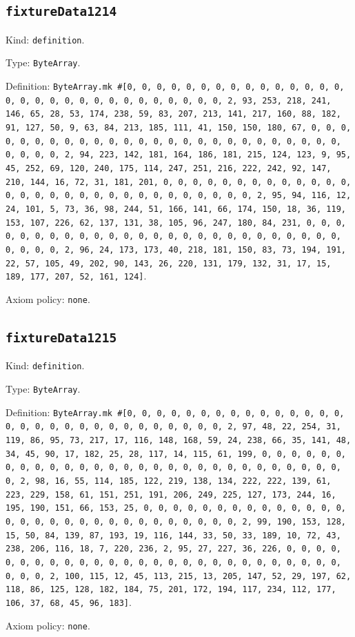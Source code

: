 \documentclass[11pt]{article}
\begin{document}
\subsection*{\texttt{fixtureData1214}}
\noindent Kind: \texttt{definition}.\par
\noindent Type: \texttt{ByteArray}.\par
\noindent Definition: \texttt{ByteArray.mk \#[0, 0, 0, 0, 0, 0, 0, 0, 0, 0, 0, 0, 0, 0, 0, 0, 0, 0, 0, 0, 0, 0, 0, 0, 0, 0, 0, 0, 0, 0, 2, 93, 253, 218, 241, 146, 65, 28, 53, 174, 238, 59, 83, 207, 213, 141, 217, 160, 88, 182, 91, 127, 50, 9, 63, 84, 213, 185, 111, 41, 150, 150, 180, 67, 0, 0, 0, 0, 0, 0, 0, 0, 0, 0, 0, 0, 0, 0, 0, 0, 0, 0, 0, 0, 0, 0, 0, 0, 0, 0, 0, 0, 0, 0, 2, 94, 223, 142, 181, 164, 186, 181, 215, 124, 123, 9, 95, 45, 252, 69, 120, 240, 175, 114, 247, 251, 216, 222, 242, 92, 147, 210, 144, 16, 72, 31, 181, 201, 0, 0, 0, 0, 0, 0, 0, 0, 0, 0, 0, 0, 0, 0, 0, 0, 0, 0, 0, 0, 0, 0, 0, 0, 0, 0, 0, 0, 0, 0, 2, 95, 94, 116, 12, 24, 101, 5, 73, 36, 98, 244, 51, 166, 141, 66, 174, 150, 18, 36, 119, 153, 107, 226, 62, 137, 131, 38, 105, 96, 247, 180, 84, 231, 0, 0, 0, 0, 0, 0, 0, 0, 0, 0, 0, 0, 0, 0, 0, 0, 0, 0, 0, 0, 0, 0, 0, 0, 0, 0, 0, 0, 0, 0, 2, 96, 24, 173, 173, 40, 218, 181, 150, 83, 73, 194, 191, 22, 57, 105, 49, 202, 90, 143, 26, 220, 131, 179, 132, 31, 17, 15, 189, 177, 207, 52, 161, 124]}.\par
\noindent Axiom policy: \texttt{none}.\par
\subsection*{\texttt{fixtureData1215}}
\noindent Kind: \texttt{definition}.\par
\noindent Type: \texttt{ByteArray}.\par
\noindent Definition: \texttt{ByteArray.mk \#[0, 0, 0, 0, 0, 0, 0, 0, 0, 0, 0, 0, 0, 0, 0, 0, 0, 0, 0, 0, 0, 0, 0, 0, 0, 0, 0, 0, 0, 0, 2, 97, 48, 22, 254, 31, 119, 86, 95, 73, 217, 17, 116, 148, 168, 59, 24, 238, 66, 35, 141, 48, 34, 45, 90, 17, 182, 25, 28, 117, 14, 115, 61, 199, 0, 0, 0, 0, 0, 0, 0, 0, 0, 0, 0, 0, 0, 0, 0, 0, 0, 0, 0, 0, 0, 0, 0, 0, 0, 0, 0, 0, 0, 0, 2, 98, 16, 55, 114, 185, 122, 219, 138, 134, 222, 222, 139, 61, 223, 229, 158, 61, 151, 251, 191, 206, 249, 225, 127, 173, 244, 16, 195, 190, 151, 66, 153, 25, 0, 0, 0, 0, 0, 0, 0, 0, 0, 0, 0, 0, 0, 0, 0, 0, 0, 0, 0, 0, 0, 0, 0, 0, 0, 0, 0, 0, 0, 0, 2, 99, 190, 153, 128, 15, 50, 84, 139, 87, 193, 19, 116, 144, 33, 50, 33, 189, 10, 72, 43, 238, 206, 116, 18, 7, 220, 236, 2, 95, 27, 227, 36, 226, 0, 0, 0, 0, 0, 0, 0, 0, 0, 0, 0, 0, 0, 0, 0, 0, 0, 0, 0, 0, 0, 0, 0, 0, 0, 0, 0, 0, 0, 0, 2, 100, 115, 12, 45, 113, 215, 13, 205, 147, 52, 29, 197, 62, 118, 86, 125, 128, 182, 184, 75, 201, 172, 194, 117, 234, 112, 177, 106, 37, 68, 45, 96, 183]}.\par
\noindent Axiom policy: \texttt{none}.\par
\end{document}
